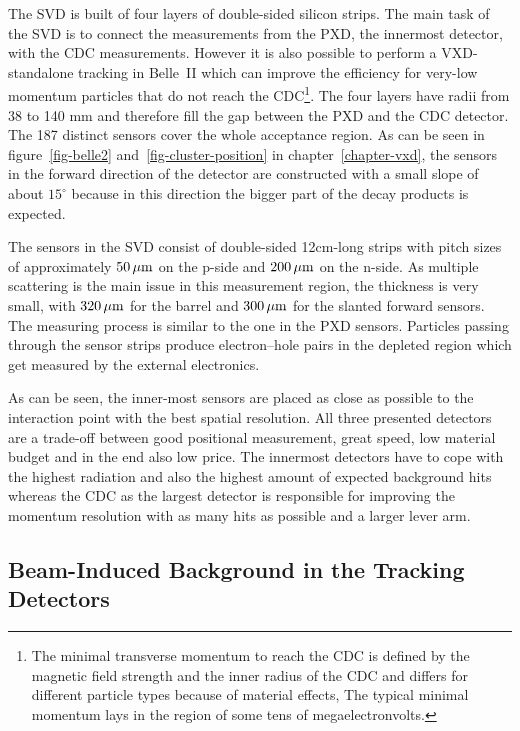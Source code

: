 The SVD is built of four layers of double-sided silicon strips. The main task of the SVD is to connect the measurements from the PXD, the innermost detector, with the CDC measurements. However it is also possible to perform a VXD-standalone tracking in Belle~II which can improve the efficiency for very-low momentum particles that do not reach the CDC\footnote{The minimal transverse momentum to reach the CDC is defined by the magnetic field strength and the inner radius of the CDC and differs for different particle types because of material effects, The typical minimal momentum lays in the region of some tens of megaelectronvolts.}. The four layers have radii from 38 to 140 mm and therefore fill the gap between the PXD and the CDC detector. The 187 distinct sensors cover the whole acceptance region. As can be seen in figure~\ref{fig-belle2} and~\ref{fig-cluster-position} in chapter~\ref{chapter-vxd}, the sensors in the forward direction of the detector are constructed with a small slope of about $15^\circ$ because in this direction the bigger part of the decay products is expected. 

The sensors in the SVD consist of double-sided 12cm-long strips with pitch sizes of approximately $\unit[50]{\mu m}$ on the p-side and $\unit[200]{\mu m}$ on the n-side. As multiple scattering is the main issue in this measurement region, the thickness is very small, with $\unit[320]{\mu m}$ for the barrel and $\unit[300]{\mu m}$ for the slanted forward sensors. The measuring process is similar to the one in the PXD sensors. Particles passing through the sensor strips produce electron--hole pairs in the depleted region which get measured by the external electronics. 

As can be seen, the inner-most sensors are placed as close as possible to the interaction point with the best spatial resolution. All three presented detectors are a trade-off between good positional measurement, great speed, low material budget and in the end also low price. The innermost detectors have to cope with the highest radiation and also the highest amount of expected background hits whereas the CDC as the largest detector is responsible for improving the momentum resolution with as many hits as possible and a larger lever arm.

\subsection{Beam-Induced Background in the Tracking Detectors}

